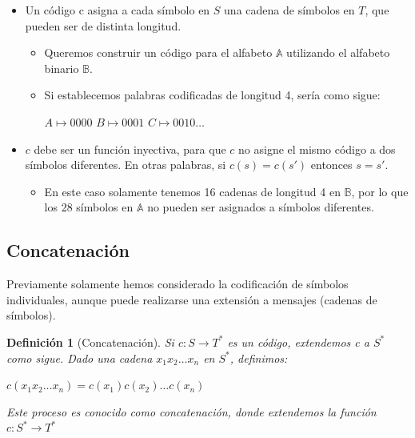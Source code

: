 \documentclass{beamer}
\newtheorem{definicion} [Definicion]{Definición}
\begin{document}
\begin{frame} 

\begin{itemize}
\item Un código c asigna a cada símbolo en $S$ una cadena de símbolos en $T$, que pueden ser de distinta longitud. 

\begin{itemize}
\item Queremos construir un código para el alfabeto $\mathbb{A}$ utilizando el alfabeto binario $\mathbb{B}$.
\item Si establecemos palabras codificadas de longitud 4, sería como sigue:  
 \begin{center} $A \mapsto 0000$ $B \mapsto 0001$ $C \mapsto 0010 \ldots$ \end{center}

\end{itemize}

\vspace{0,5cm}

\item $c$ debe ser un función inyectiva, para que $c$ no asigne el mismo código  a dos símbolos diferentes. En otras palabras, si $c(s) = c(s')$ entonces $s = s'$. 
\begin{itemize}
\item En este caso solamente tenemos 16 cadenas de longitud 4 en $\mathbb{B}$, por lo que los 28 símbolos en $\mathbb{A}$ no pueden ser asignados a símbolos diferentes. 

\end{itemize}
\end{itemize}


\end{frame}



\subsection{Concatenación}

\begin{frame}
Previamente solamente hemos considerado la codificación de símbolos individuales, aunque puede realizarse una extensión a mensajes (cadenas de símbolos).

\begin{definicion} [Concatenación]

Si $c: S \rightarrow T^{*}$ es un código, extendemos c a $S^{*}$ como sigue. Dado una cadena 
$x_{1} x_{2}\ldots x_{n}$ en $S^{*}$, definimos:

\begin{center}
$c(x_{1}x_{2} \ldots x_{n}) = c(x_{1})c(x_{2}) \ldots c(x_{n})$
\end{center}

Este proceso es conocido como concatenación, donde extendemos la función $c: S^{*} \rightarrow T^{*}$
\end{definicion}


\end{frame}
\end{document}
